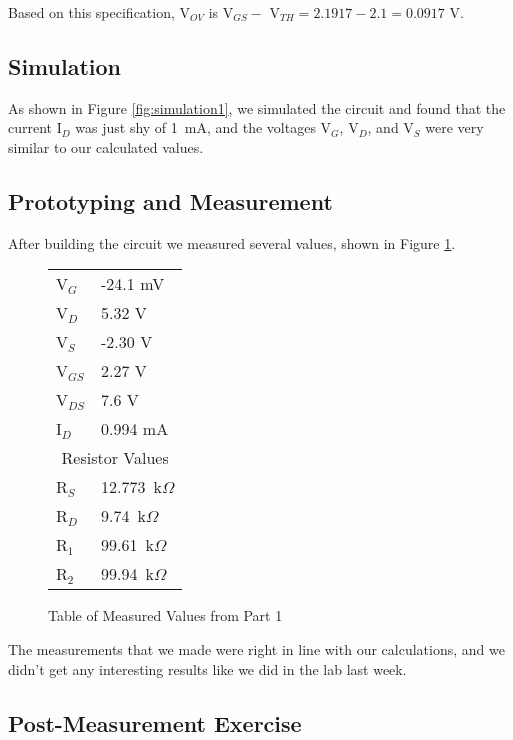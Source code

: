\documentclass{article}
\begin{document}
Based on this specification, V$_{OV}$ is V$_{GS}-$ V$_{TH}=2.1917-2.1=0.0917$ V.

\subsection{Simulation}

As shown in Figure \ref{fig:simulation1}, we simulated the circuit
and found that the current I$_D$ was just shy of 1~mA, and the
voltages V$_{G}$, V$_{D}$, and V$_S$ were very similar to our
calculated values.


\subsection{Prototyping and Measurement}
After building the circuit we measured several values, shown in 
Figure \ref{fig:tablevalues1}.

\begin{figure}[!h]
\begin{center}
\begin{tabular}{ l|l }
  V$_G$ & -24.1 mV  \\
  V$_D$ & 5.32 V    \\
  V$_S$ & -2.30 V   \\
  V$_{GS}$ & 2.27 V \\
  V$_{DS}$ & 7.6 V  \\
  I$_D$ & 0.994 mA \\
  \multicolumn{2}{c}{Resistor Values} \\
  R$_S$ & 12.773~k$\Omega$ \\
  R$_D$ & 9.74~k$\Omega$   \\
  R$_1$ & 99.61~k$\Omega$  \\
  R$_2$ & 99.94~k$\Omega$
\end{tabular}
\caption{Table of Measured Values from Part 1}
\label{fig:tablevalues1}
\end{center}
\end{figure}

The measurements that we made were right in line with our
calculations, and we didn't get any interesting results
like we did in the lab last week.

\subsection{Post-Measurement Exercise}
\end{document}

